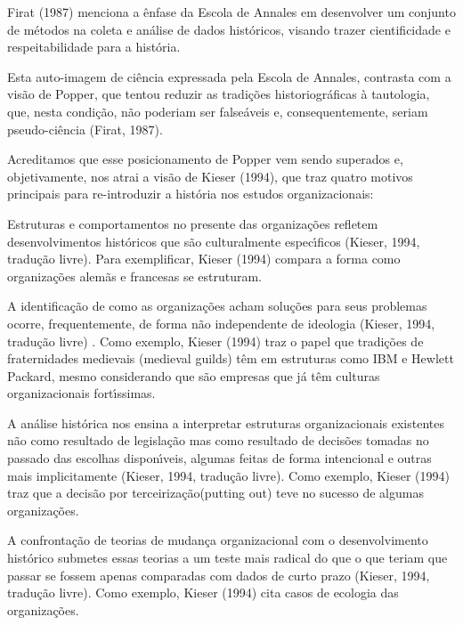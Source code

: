 \documentclass[
12pt,		%
openright,	%
twoside,  %
a4paper,			%
chapter=TITLE,		%
english,			%
french,				%
spanish,			%
brazil				%
]{USPSC-classe/USPSC}
\begin{document}
 Firat (1987) menciona a \^enfase da Escola de Annales em \textquotedbl desenvolver um conjunto de m\'etodos na coleta e an\'alise de dados hist\'oricos\textquotedbl , visando \textquotedbl trazer cientificidade e respeitabilidade para a hist\'oria\textquotedbl .








Esta auto-imagem de ci\^encia expressada pela Escola de Annales, contrasta com a vis\~ao de Popper, que tentou reduzir as tradi\c{c}\~oes historiogr\'aficas \`a tautologia, que, nesta condi\c{c}\~ao, n\~ao poderiam ser false\'aveis e, consequentemente, seriam pseudo-ci\^encia  (Firat, 1987).








Acreditamos que esse posicionamento de Popper vem sendo superados e, objetivamente, nos atrai a vis\~ao de  Kieser (1994), que traz quatro motivos principais para re-introduzir a hist\'oria nos estudos organizacionais:









\begin{alineas}
\item Estruturas e comportamentos no presente das organiza\c{c}\~oes refletem desenvolvimentos hist\'oricos que s\~ao culturalmente espec\'{\i}ficos  (Kieser, 1994, tradu\c{c}\~ao livre). Para exemplificar,  Kieser (1994) compara a forma como organiza\c{c}\~oes alem\~as e francesas se estruturam.
\item A identifica\c{c}\~ao de como as organiza\c{c}\~oes acham solu\c{c}\~oes para seus problemas ocorre, frequentemente, de forma n\~ao independente de ideologia  (Kieser, 1994, tradu\c{c}\~ao livre) . Como exemplo,  Kieser (1994) traz o papel  que tradi\c{c}\~oes de fraternidades medievais (medieval guilds) t\^em em estruturas como IBM e Hewlett Packard, mesmo considerando que s\~ao empresas que j\'a t\^em culturas organizacionais fort\'{\i}ssimas.
\item A an\'alise hist\'orica nos ensina a interpretar estruturas organizacionais existentes n\~ao como resultado de legisla\c{c}\~ao mas como resultado de decis\~oes tomadas no passado das escolhas dispon\'{\i}veis, algumas feitas de forma intencional e outras mais implicitamente  (Kieser, 1994, tradu\c{c}\~ao livre). Como exemplo,  Kieser (1994) traz que a decis\~ao por \textquotedbl terceiriza\c{c}\~ao\textquotedbl  (putting out) teve no sucesso de algumas organiza\c{c}\~oes.
\item A confronta\c{c}\~ao de teorias de mudan\c{c}a organizacional com o desenvolvimento hist\'orico submetes essas teorias a um teste mais radical do que o que teriam que passar se fossem apenas comparadas com dados de curto prazo (Kieser, 1994, tradu\c{c}\~ao livre). Como exemplo,  Kieser (1994) cita casos de ecologia das organiza\c{c}\~oes.
\end{alineas}
\end{document}

